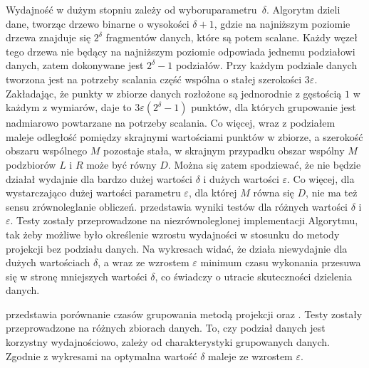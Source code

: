 
Wydajność  w dużym stopniu zależy od wyboru\linebreak \mbox{parametru $ \delta $}. Algorytm dzieli dane, tworząc drzewo binarne o wysokości $ \delta + 1 $, gdzie na najniższym poziomie drzewa znajduje się $ 2^\delta $ fragmentów danych, które są potem scalane. Każdy węzeł tego drzewa nie będący na najniższym poziomie odpowiada jednemu podziałowi danych, zatem dokonywane jest $ 2^\delta - 1 $ podziałów. Przy każdym podziale danych tworzona jest na potrzeby scalania część wspólna o stałej szerokości $ 3\varepsilon $. Zakładając, że punkty w zbiorze danych rozłożone są jednorodnie z gęstością $ 1 $ w każdym z wymiarów, daje to $ 3\varepsilon(2^\delta - 1) $ punktów, dla których grupowanie jest nadmiarowo powtarzane na potrzeby scalania. Co więcej, wraz z podziałem maleje odległość pomiędzy skrajnymi wartościami punktów w zbiorze, a szerokość obszaru wspólnego $ M $ pozostaje stała, w skrajnym przypadku obszar wspólny $ M $ podzbiorów $ L $ i $ R $ może być równy $ D $. Można się zatem spodziewać, że  nie będzie działał wydajnie dla bardzo dużej wartości $ \delta $ i dużych wartości $ \varepsilon $. Co więcej, dla wystarczająco dużej wartości parametru $ \varepsilon $, dla której $ M $ równa się $ D $, nie ma też sensu zrównoleglanie obliczeń.  przedstawia wyniki testów  dla różnych wartości $ \delta $ i $ \varepsilon $. Testy zostały przeprowadzone na niezrównoleglonej implementacji Algorytmu, tak żeby możliwe było określenie wzrostu wydajności w stosunku do metody projekcji bez podziału danych. Na wykresach widać, że  działa niewydajnie dla dużych wartościach $ \delta $, a wraz ze wzrostem $ \varepsilon $ minimum czasu wykonania przesuwa się w stronę mniejszych wartości $ \delta $, co świadczy o utracie skuteczności dzielenia danych. \par
{} przedstawia porównanie czasów grupowania metodą projekcji oraz . Testy zostały przeprowadzone na różnych zbiorach danych. To, czy podział danych jest korzystny wydajnościowo, zależy od charakterystyki grupowanych danych. Zgodnie z wykresami na  optymalna wartość $ \delta $ maleje ze wzrostem $ \varepsilon $.
